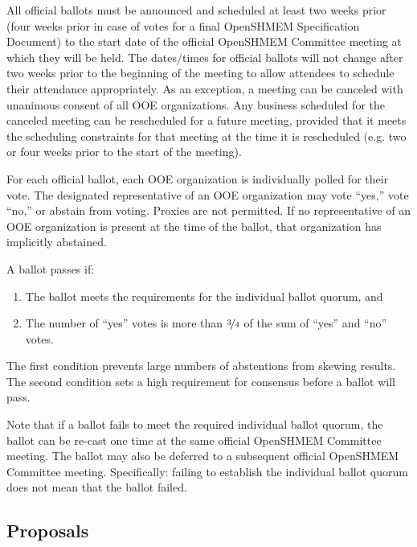 All official ballots must be announced and scheduled at least two
weeks prior (four weeks prior in case of votes for a final OpenSHMEM Specification
Document) to the start date of the official OpenSHMEM Committee meeting at
which they will be held.  The dates/times for official ballots will
not change after two weeks prior to the beginning of the meeting to
allow attendees to schedule their attendance appropriately.
As an exception, a meeting can be canceled with unanimous consent of
all OOE organizations. Any business scheduled for the canceled meeting can be
rescheduled for a future meeting, provided that it meets the scheduling
constraints for that meeting at the time it is rescheduled (e.g. two or four
weeks prior to the start of the meeting).

For each official ballot, each OOE organization is individually
polled for their vote.  The designated representative of an OOE
organization may vote ``yes,'' vote ``no,'' or abstain from voting.
Proxies are not permitted.  If no representative of an OOE
organization is present at the time of the ballot, that
organization has implicitly abstained.

A ballot passes if:

\begin{enumerate}
\item The ballot meets the requirements for the individual ballot
  quorum, and
\item The number of ``yes'' votes is more than $\nicefrac{3}{4}$ of
  the sum of ``yes'' and ``no'' votes.
\end{enumerate}

\begin{rationale}
  The first condition prevents large numbers of abstentions from
  skewing results.  The second condition sets a high requirement for
  consensus before a ballot will pass.
\end{rationale}

Note that if a ballot fails to meet the required individual ballot
quorum, the ballot can be re-cast one time at the same official OpenSHMEM
Committee meeting.  The ballot may also be deferred to a subsequent
official OpenSHMEM Committee meeting.  Specifically: failing to establish the
individual ballot quorum does not mean that the ballot failed.


\subsection{Proposals}
\label{subsec:general-text-proposals}

